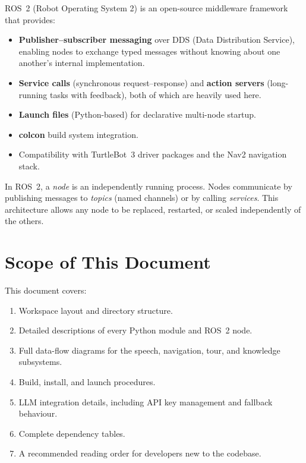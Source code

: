 \documentclass[12pt,a4paper]{report}
\begin{document}
ROS~2 (Robot Operating System 2) is an open-source middleware framework that
provides:

\begin{itemize}[leftmargin=2em]
  \item \textbf{Publisher--subscriber messaging} over DDS (Data Distribution
        Service), enabling nodes to exchange typed messages without knowing
        about one another's internal implementation.
  \item \textbf{Service calls} (synchronous request--response) and
        \textbf{action servers} (long-running tasks with feedback), both of
        which are heavily used here.
  \item \textbf{Launch files} (Python-based) for declarative multi-node
        startup.
  \item \textbf{colcon} build system integration.
  \item Compatibility with TurtleBot~3 driver packages and the Nav2
        navigation stack.
\end{itemize}

\begin{tcolorbox}[notebox, title=Key Concept: Node]
  In ROS~2, a \emph{node} is an independently running process.  Nodes
  communicate by publishing messages to \emph{topics} (named channels)
  or by calling \emph{services}.  This architecture allows any node to
  be replaced, restarted, or scaled independently of the others.
\end{tcolorbox}

\section{Scope of This Document}

This document covers:

\begin{enumerate}[leftmargin=2em]
  \item Workspace layout and directory structure.
  \item Detailed descriptions of every Python module and ROS~2 node.
  \item Full data-flow diagrams for the speech, navigation, tour, and
        knowledge subsystems.
  \item Build, install, and launch procedures.
  \item LLM integration details, including API key management and
        fallback behaviour.
  \item Complete dependency tables.
  \item A recommended reading order for developers new to the codebase.
\end{enumerate}
\end{document}
